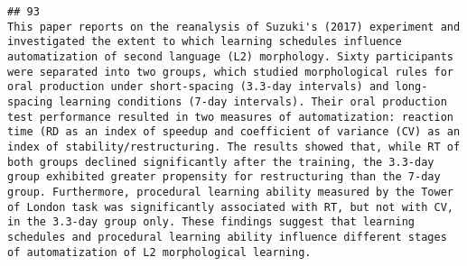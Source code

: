\documentclass[
  english,
  man]{apa6}
\begin{document}
\begin{verbatim}
## 93                                                                                                                                                                                                                                                                                                                                                                                                                                                                                                                                                                                                                                                                                                                                                                                                                                                                                                                                                                                                                                                                                                                                                                                                                                                                                                                                                                                                                                                                                                                                                        This paper reports on the reanalysis of Suzuki's (2017) experiment and investigated the extent to which learning schedules influence automatization of second language (L2) morphology. Sixty participants were separated into two groups, which studied morphological rules for oral production under short-spacing (3.3-day intervals) and long-spacing learning conditions (7-day intervals). Their oral production test performance resulted in two measures of automatization: reaction time (RD as an index of speedup and coefficient of variance (CV) as an index of stability/restructuring. The results showed that, while RT of both groups declined significantly after the training, the 3.3-day group exhibited greater propensity for restructuring than the 7-day group. Furthermore, procedural learning ability measured by the Tower of London task was significantly associated with RT, but not with CV, in the 3.3-day group only. These findings suggest that learning schedules and procedural learning ability influence different stages of automatization of L2 morphological learning.

\end{verbatim}
\end{document}
